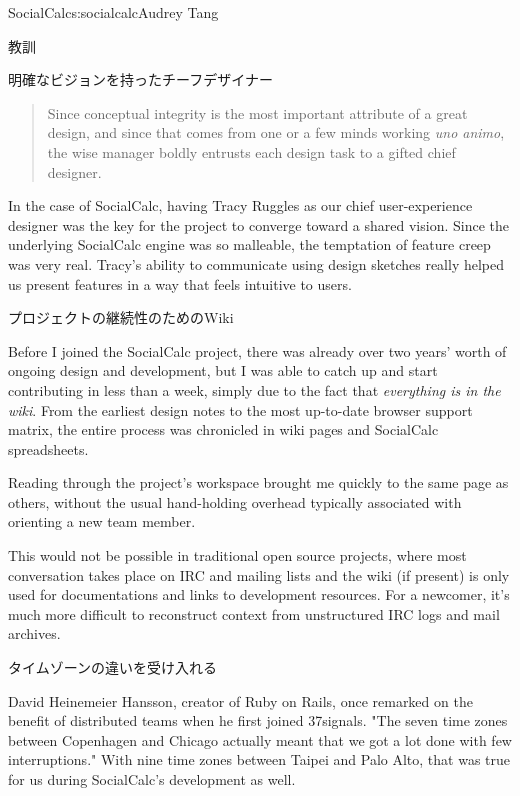 \begin{aosachapter}{SocialCalc}{s:socialcalc}{Audrey Tang}
\begin{aosasect1}{教訓}
\begin{aosasect2}{明確なビジョンを持ったチーフデザイナー}
\begin{quotation}
  \noindent
  Since conceptual integrity is the most important attribute of a
  great design, and since that comes from one or a few minds working
  \emph{uno animo}, the wise manager boldly entrusts each design task to a
  gifted chief designer.

\end{quotation}

In the case of SocialCalc, having Tracy Ruggles as our chief
user-experience designer was the key for the project to converge
toward a shared vision.  Since the underlying SocialCalc engine was
so malleable, the temptation of feature creep was very real. Tracy's
ability to communicate using design sketches really helped us
present features in a way that feels intuitive to users.

\end{aosasect2}

\begin{aosasect2}{プロジェクトの継続性のためのWiki}

Before I joined the SocialCalc project, there was already over two
years' worth of ongoing design and development, but I was able to
catch up and start contributing in less than a week, simply due to
the fact that \emph{everything is in the wiki}. From the earliest
design notes to the most up-to-date browser support matrix, the
entire process was chronicled in wiki pages and SocialCalc
spreadsheets.

Reading through the project's workspace brought me quickly to the same
page as others, without the usual hand-holding overhead
typically associated with orienting a new team member.

This would not be possible in traditional open source projects, where
most conversation takes place on IRC and mailing lists and the wiki
(if present) is only used for documentations and links to development
resources.  For a newcomer, it's much more difficult to reconstruct
context from unstructured IRC logs and mail archives.

\end{aosasect2}

\begin{aosasect2}{タイムゾーンの違いを受け入れる}

David Heinemeier Hansson, creator of Ruby on Rails, once remarked on
the benefit of distributed teams when he first joined 37signals. "The
seven time zones between Copenhagen and Chicago actually meant that
we got a lot done with few interruptions." With nine time zones
between Taipei and Palo Alto, that was true for us during
SocialCalc's development as well.


\end{aosasect2}
\end{aosasect1}
\end{aosachapter}
